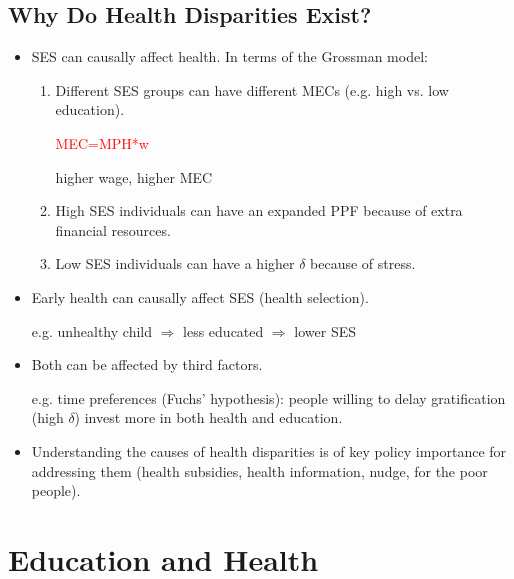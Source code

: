 \subsection{Why Do Health Disparities Exist?}
\begin{itemize}
        \item SES can causally affect health. In terms of the Grossman model:
        \begin{enumerate}
            \item Different SES groups can have different MECs (e.g. high vs. low education).

            \textcolor{red}{MEC=MPH*w} 

            higher wage, higher MEC

            
            \item High SES individuals can have an expanded PPF because of extra financial resources.
            \item Low SES individuals can have a higher $\delta$ because of stress.
        \end{enumerate}
        \item Early health can causally affect SES (health selection).

        e.g. unhealthy child $\Rightarrow$ less educated $\Rightarrow$ lower SES
        
        \item Both can be affected by third factors.
        
        e.g. time preferences (Fuchs’ hypothesis): people willing to delay gratification (high $\delta$) invest more in both health and education.

        \item Understanding the causes of health disparities is of key policy importance for addressing them (health subsidies, health information, nudge, for the poor people).
\end{itemize}

\section{Education and Health}

